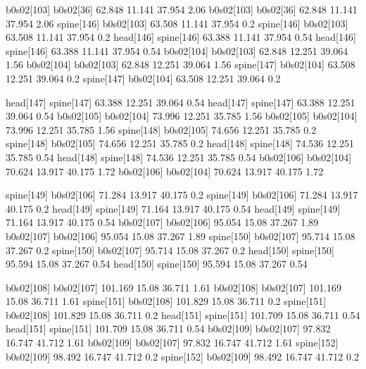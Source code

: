 b0s02[103]    b0s02[36]    62.848    11.141    37.954    2.06
b0s02[103]    b0s02[36]    62.848    11.141    37.954    2.06
spine[146]    b0s02[103]    63.508    11.141    37.954    0.2
spine[146]    b0s02[103]    63.508    11.141    37.954    0.2
head[146]    spine[146]    63.388    11.141    37.954    0.54
head[146]    spine[146]    63.388    11.141    37.954    0.54
b0s02[104]    b0s02[103]    62.848    12.251    39.064    1.56
b0s02[104]    b0s02[103]    62.848    12.251    39.064    1.56
spine[147]    b0s02[104]    63.508    12.251    39.064    0.2
spine[147]    b0s02[104]    63.508    12.251    39.064    0.2


head[147]    spine[147]    63.388    12.251    39.064    0.54
head[147]    spine[147]    63.388    12.251    39.064    0.54
b0s02[105]    b0s02[104]    73.996    12.251    35.785    1.56
b0s02[105]    b0s02[104]    73.996    12.251    35.785    1.56
spine[148]    b0s02[105]    74.656    12.251    35.785    0.2
spine[148]    b0s02[105]    74.656    12.251    35.785    0.2
head[148]    spine[148]    74.536    12.251    35.785    0.54
head[148]    spine[148]    74.536    12.251    35.785    0.54
b0s02[106]    b0s02[104]    70.624    13.917    40.175    1.72
b0s02[106]    b0s02[104]    70.624    13.917    40.175    1.72


spine[149]    b0s02[106]    71.284    13.917    40.175    0.2
spine[149]    b0s02[106]    71.284    13.917    40.175    0.2
head[149]    spine[149]    71.164    13.917    40.175    0.54
head[149]    spine[149]    71.164    13.917    40.175    0.54
b0s02[107]    b0s02[106]    95.054    15.08    37.267    1.89
b0s02[107]    b0s02[106]    95.054    15.08    37.267    1.89
spine[150]    b0s02[107]    95.714    15.08    37.267    0.2
spine[150]    b0s02[107]    95.714    15.08    37.267    0.2
head[150]    spine[150]    95.594    15.08    37.267    0.54
head[150]    spine[150]    95.594    15.08    37.267    0.54


b0s02[108]    b0s02[107]    101.169    15.08    36.711    1.61
b0s02[108]    b0s02[107]    101.169    15.08    36.711    1.61
spine[151]    b0s02[108]    101.829    15.08    36.711    0.2
spine[151]    b0s02[108]    101.829    15.08    36.711    0.2
head[151]    spine[151]    101.709    15.08    36.711    0.54
head[151]    spine[151]    101.709    15.08    36.711    0.54
b0s02[109]    b0s02[107]    97.832    16.747    41.712    1.61
b0s02[109]    b0s02[107]    97.832    16.747    41.712    1.61
spine[152]    b0s02[109]    98.492    16.747    41.712    0.2
spine[152]    b0s02[109]    98.492    16.747    41.712    0.2


